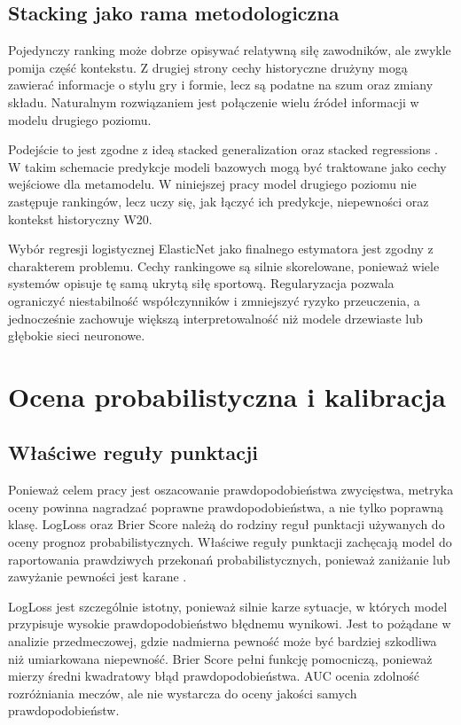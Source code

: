 \subsection{Stacking jako rama metodologiczna}

Pojedynczy ranking może dobrze opisywać relatywną siłę zawodników, ale zwykle pomija część
kontekstu. Z drugiej strony cechy historyczne drużyny mogą zawierać informacje o stylu gry i formie,
lecz są podatne na szum oraz zmiany składu. Naturalnym rozwiązaniem jest połączenie wielu źródeł
informacji w modelu drugiego poziomu.

Podejście to jest zgodne z ideą stacked generalization \parencite{wolpert1992} oraz stacked
regressions \parencite{breiman1996stacked}. W takim schemacie predykcje modeli bazowych mogą być
traktowane jako cechy wejściowe dla metamodelu. W niniejszej pracy model drugiego poziomu nie
zastępuje rankingów, lecz uczy się, jak łączyć ich predykcje, niepewności oraz kontekst historyczny
W20.

Wybór regresji logistycznej ElasticNet jako finalnego estymatora jest zgodny z charakterem problemu.
Cechy rankingowe są silnie skorelowane, ponieważ wiele systemów opisuje tę samą ukrytą siłę
sportową. Regularyzacja pozwala ograniczyć niestabilność współczynników i zmniejszyć ryzyko
przeuczenia, a jednocześnie zachowuje większą interpretowalność niż modele drzewiaste lub głębokie
sieci neuronowe.

\section{Ocena probabilistyczna i kalibracja}

\subsection{Właściwe reguły punktacji}

Ponieważ celem pracy jest oszacowanie prawdopodobieństwa zwycięstwa, metryka oceny powinna nagradzać
poprawne prawdopodobieństwa, a nie tylko poprawną klasę. LogLoss oraz Brier Score należą do rodziny
reguł punktacji używanych do oceny prognoz probabilistycznych. Właściwe reguły punktacji zachęcają
model do raportowania prawdziwych przekonań probabilistycznych, ponieważ zaniżanie lub zawyżanie
pewności jest karane \parencite{gneiting2007}.

LogLoss jest szczególnie istotny, ponieważ silnie karze sytuacje, w których model przypisuje wysokie
prawdopodobieństwo błędnemu wynikowi. Jest to pożądane w analizie przedmeczowej, gdzie nadmierna
pewność może być bardziej szkodliwa niż umiarkowana niepewność. Brier Score pełni funkcję
pomocniczą, ponieważ mierzy średni kwadratowy błąd prawdopodobieństwa. AUC ocenia zdolność
rozróżniania meczów, ale nie wystarcza do oceny jakości samych prawdopodobieństw.

